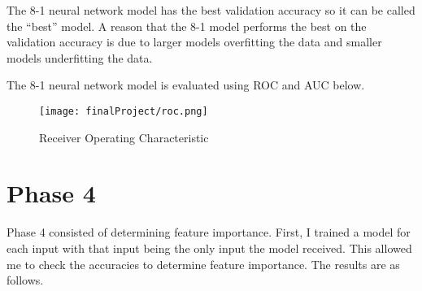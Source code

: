 \documentclass{article}
\begin{document}
The 8-1 neural network model has the best validation accuracy so it can be called the “best” model. A reason that the 8-1 model performs the best on the validation accuracy is due to larger models overfitting the data and smaller models underfitting the data.

The 8-1 neural network model is evaluated using ROC and AUC below.

\begin{figure}[H]
\centering
\texttt{[image: finalProject/roc.png]}
\caption{Receiver Operating Characteristic}
\label{fig:my_label}
\end{figure}

\section{Phase 4}

Phase 4 consisted of determining feature importance. First, I trained a model for each input with that input being the only input the model received. This allowed me to check the accuracies to determine feature importance. The results are as follows. 
\end{document}
